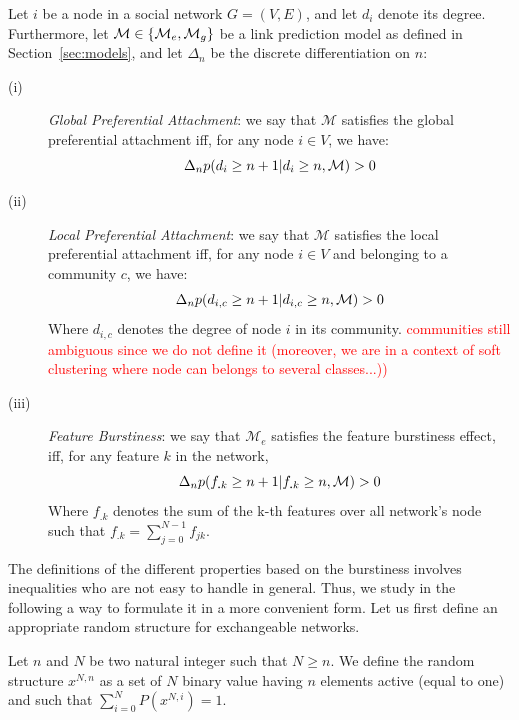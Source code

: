 \begin{definition}
Let $i$ be a node in a social network $G=(V,E)$, and let $d_i$ denote its degree. Furthermore, let $\mathcal{M} \in \{\mathcal{M}_e, \mathcal{M}_g\}$ be a link prediction model as defined in Section~\ref{sec:models}, and let $\Delta_n$ be the discrete differentiation on $n$: 
\begin{description}
\item[(i)] \emph{Global Preferential Attachment}: we say that $\mathcal{M}$ satisfies the global preferential attachment iff, for any node $i \in V$, we have:
 \begin{equation}
 \Delta_n p(d_i \geq n+1 | d_i \geq n,  \mathcal{M}) > 0
 \end{equation}
\item[(ii)] \emph{Local Preferential Attachment}: we say that $\mathcal{M}$ satisfies the local preferential attachment iff, for any node $i \in V$ and belonging to a community  $c$, we have:
  \begin{equation}
 \Delta_n p(d_{i,c} \geq n+1 | d_{i,c} \geq n,  \mathcal{M}) > 0
 \end{equation}
  Where $d_{i,c}$ denotes the degree of node $i$ in its community. \textcolor{red}{communities still ambiguous since we do not define it (moreover, we are in a context of soft clustering where node can belongs to several classes...)) }
\item[(iii)] \emph{Feature Burstiness}: we say that $\mathcal{M}_e$ satisfies the feature burstiness effect, iff, for any feature $k$ in the network,   
  \begin{equation}
	\Delta_n p(f_{\bm{.}k} \geq n+1 | f_{\bm{.}k} \geq n,  \mathcal{M}) > 0
  \end{equation}
   Where $f_{\bm{.}k}$ denotes the sum of the k-th features over all network's node such that $f_{\bm{.}k} = \sum_{j=0}^{N-1} f_{jk}$.
\end{description}
\label{def:burst-soc-net}
\end{definition}
%
The definitions of the different properties based on the burstiness involves inequalities who are not easy to handle in general. Thus, we study in the following a way to formulate it in a more convenient form. Let us first define an appropriate random structure for exchangeable networks.

\begin{definition}
	Let $n$ and $N$ be two natural integer such that $N \geq n$. We define the random structure $x^{N,n}$ as a set of $N$ binary value having $n$ elements active (equal to one) and such that $\sum_{i=0}^N P(x^{N,i}) = 1$.
	\label{def:rd_struct}
\end{definition}


